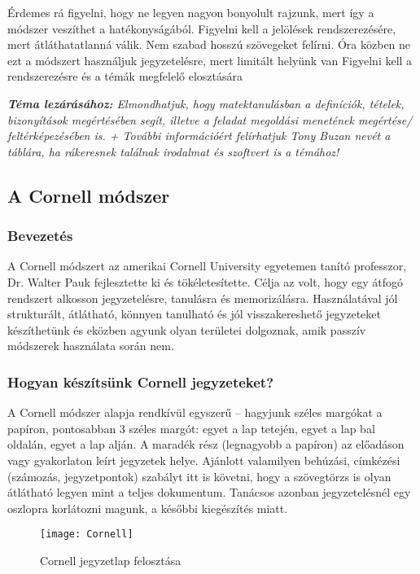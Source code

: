 \documentclass[../Main.tex]{subfiles}
\begin{document}
Érdemes rá figyelni, hogy ne legyen nagyon bonyolult rajzunk, mert így a módszer veszíthet a hatékonyságából.
Figyelni kell a jelölések rendszerezésére, mert átláthatatlanná válik.
Nem szabad hosszú szövegeket felírni.
Óra közben ne ezt a módszert használjuk jegyzetelésre, mert limitált helyünk van
Figyelni kell a rendszerezésre és a témák megfelelő elosztására

\textit{\textbf{Téma lezárásához:} Elmondhatjuk, hogy matektanulásban a definíciók, tételek, bizonyítások megértésében segít, illetve a feladat megoldási menetének megértése/ feltérképezésében is.
+ További információért felírhatjuk Tony Buzan nevét a táblára, ha rákeresnek találnak irodalmat és szoftvert is a témához!}

\subsection{A Cornell módszer}

\subsubsection{Bevezetés}


A Cornell módszert az amerikai Cornell University egyetemen tanító professzor, Dr.
Walter Pauk fejlesztette ki és tökéletesítette. Célja az volt, hogy egy átfogó rendszert
alkosson jegyzetelésre, tanulásra és memorizálásra. Használatával jól strukturált,
átlátható, könnyen tanulható és jól visszakereshető jegyzeteket készíthetünk és eközben
agyunk olyan területei dolgoznak, amik passzív módszerek használata során nem.


\subsubsection{Hogyan készítsünk Cornell jegyzeteket?}

A Cornell módszer alapja rendkívül
egyszerű – hagyjunk széles margókat a
papíron, pontosabban 3 széles margót: egyet a
lap tetején, egyet a lap bal oldalán, egyet a lap
alján. A maradék rész (legnagyobb a papíron)
az előadáson vagy gyakorlaton leírt jegyzetek
helye. Ajánlott valamilyen behúzási,
címkézési (számozás, jegyzetpontok) szabályt
itt is követni, hogy a szövegtörzs is olyan
átlátható legyen mint a teljes dokumentum.
Tanácsos azonban jegyzetelésnél egy oszlopra
korlátozni magunk, a későbbi kiegészítés
miatt.

\begin{wrapfigure}{r}{0.5\textwidth}
    \centering
    \texttt{[image: Cornell]}
    \caption{Cornell jegyzetlap felosztása}
    \end{wrapfigure}
    
\end{document}
